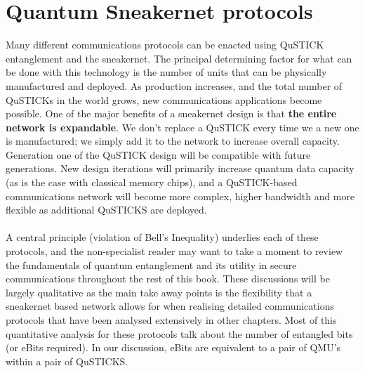 \documentclass[aps,prl,twocolumn,10pt,nofootinbib]{revtex4}
\begin{document}
\section{Quantum Sneakernet protocols}
Many different communications protocols can be enacted using QuSTICK entanglement and the sneakernet.  The principal determining factor for what can be done with this technology is the number of units that can be physically manufactured and deployed.  As production increases, and the total number of QuSTICKs in the world grows, new communications applications become possible.  One of the major benefits of a sneakernet design is that {\bf the entire network is expandable}.  We don't replace a QuSTICK every time we a new one is manufactured; we simply add it to the network to increase overall capacity.  Generation one of the QuSTICK design will be compatible with future generations. New design iterations will primarily increase quantum data capacity (as is the case with classical memory chips), and a QuSTICK-based communications network will become more complex, higher bandwidth and more flexible as additional QuSTICKS are deployed.  
\\
\\
A central principle (violation of Bell's Inequality) underlies each of these protocols, and the non-specialist reader may want to take a moment to review the fundamentals of quantum entanglement and its utility in secure communications throughout the rest of this book.  These discussions will be largely qualitative as the main take away points is the flexibility that a sneakernet based network allows for when realising detailed communications protocols that have been analysed extensively in other chapters.  Most of this quantitative analysis for these protocols talk about the number of entangled bits (or eBits required).  In our discussion, eBits are equivalent to a pair of QMU's within a pair of QuSTICKS. 
\end{document}
